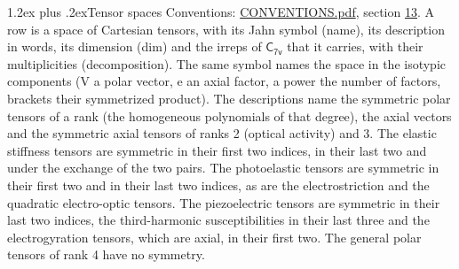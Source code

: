 \documentclass[10pt,a4paper]{article}
\makeatletter
\renewcommand\section{\@startsection{section}{1}{\z@}{-3ex plus -1ex minus -.2ex}%
  {1.2ex plus .2ex}{\normalfont\large\sffamily\bfseries\color{parttitle}}}
\numberwithin{equation}{section}
\newcommand{\grp}[1]{\mathsf{#1}}
\makeatother
\begin{document}
\section{Tensor spaces}\label{s:tensor_spaces}
Conventions: \href{../../CONVENTIONS.pdf}{CONVENTIONS.pdf}, section \href{../../CONVENTIONS.pdf\#conv.13}{13}.
\leavevmode\label{n:head.name}\label{n:head.description}\label{n:head.dim}\label{n:head.decomposition}A row is a space of Cartesian tensors, with its Jahn symbol (name), its description in words, its dimension (dim) and the irreps of $\grp{C_{7v}}$ that it carries, with their multiplicities (decomposition). \label{n:label.jahn}The same symbol names the space in the isotypic components (V a polar vector, e an axial factor, a power the number of factors, brackets their symmetrized product). The descriptions name the symmetric polar tensors of a rank (the homogeneous polynomials of that degree), the axial vectors and the symmetric axial tensors of ranks 2 (optical activity) and 3. The elastic stiffness tensors are symmetric in their first two indices, in their last two and under the exchange of the two pairs. The photoelastic tensors are symmetric in their first two and in their last two indices, as are the electrostriction and the quadratic electro-optic tensors. The piezoelectric tensors are symmetric in their last two indices, the third-harmonic susceptibilities in their last three and the electrogyration tensors, which are axial, in their first two. The general polar tensors of rank 4 have no symmetry.
\end{document}
